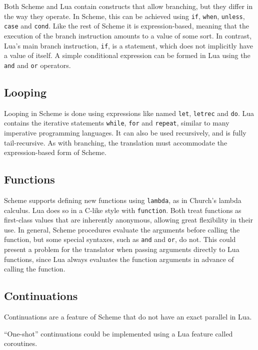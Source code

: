 Both Scheme and Lua contain constructs that allow branching, but they differ in
the way they operate. In Scheme, this can be achieved using \texttt{if},
\texttt{when}, \texttt{unless}, \texttt{case} and \texttt{cond}. Like the rest
of Scheme it is expression-based, meaning that the execution of the branch
instruction amounts to a value of some sort. In contrast, Lua's main branch
instruction, \texttt{if}, is a statement, which does not implicitly have a value
of itself. A simple conditional expression can be formed in Lua using the
\texttt{and} and \texttt{or} operators.

\subsection{Looping}

Looping in Scheme is done using expressions like named \texttt{let},
\texttt{letrec} and \texttt{do}. Lua contains the iterative statements
\texttt{while}, \texttt{for} and \texttt{repeat}, similar to many imperative
programming languages. It can also be used recursively, and is fully
tail-recursive. As with branching, the translation must accommodate the
expression-based form of Scheme.

\subsection{Functions}

Scheme supports defining new functions using \texttt{lambda}, as in Church's
lambda calculus. Lua does so in a C-like style with \texttt{function}. Both
treat functions as first-class values that are inherently anonymous, allowing
great flexibility in their use. In general, Scheme procedures evaluate the
arguments before calling the function, but some special syntaxes, such as
\texttt{and} and \texttt{or}, do not. This could present a problem for the
translator when passing arguments directly to Lua functions, since Lua always
evaluates the function arguments in advance of calling the function.

\subsection{Continuations}

Continuations are a feature of Scheme that do not have an exact parallel in Lua.

``One-shot'' continuations could be implemented using a Lua feature called
coroutines.

